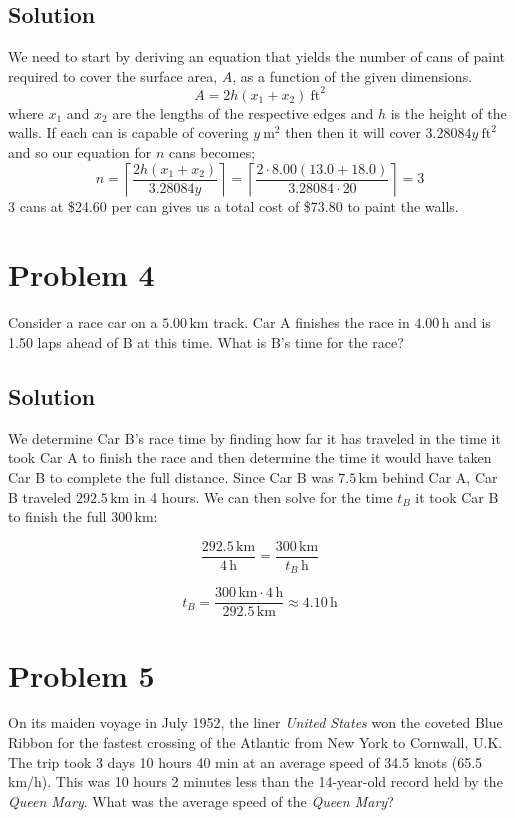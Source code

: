 \documentclass{article}
\newcommand{\kilo}{\text{k}}
\newcommand{\meter}{\text{m}}
\newcommand{\foot}{\text{ft}}
\begin{document}
\subsection*{Solution}
We need to start by deriving an equation that yields the number of cans of paint required to cover the surface area, $A$, as a function of the given dimensions.
\[
	A = 2h(x_1 + x_2)\ \foot^2
\]
where $x_1$ and $x_2$ are the lengths of the respective edges and $h$ is the height of the walls. If each can is capable of covering $y\ \meter^2$ then then it will cover $3.28084y\ \foot^2$ and so our equation for $n$ cans becomes;
\[
	n = \left\lceil\frac{2h(x_1 + x_2)}{3.28084y}\right\rceil = \left\lceil\frac{2\cdot8.00(13.0 + 18.0)}{3.28084\cdot20}\right\rceil = 3
\]
3 cans at \$24.60 per can gives us a total cost of \$73.80 to paint the walls.

\section*{Problem 4}
Consider a race car on a \(5.00 \, \si{\kilo\meter}\) track. Car A finishes the race in \(4.00 \, \si{\hour}\) and is 1.50 laps ahead of B at this time. What is B's time for the race?

\subsection*{Solution}
We determine Car B's race time by finding how far it has traveled in the time it took Car A to finish the race and then determine the time it would have taken Car B to complete the full distance. Since Car B was \(7.5 \, \si{\kilo\meter}\) behind Car A, Car B traveled \(292.5 \, \si{\kilo\meter}\) in 4 hours. We can then solve for the time \( t_B \) it took Car B to finish the full \(300 \, \si{\kilo\meter}\):

\[
\frac{292.5 \, \si{\kilo\meter}}{4 \, \si{\hour}} = \frac{300 \, \si{\kilo\meter}}{t_B \, \si{\hour}}
\]

\[
t_B = \frac{300 \, \si{\kilo\meter} \cdot 4 \, \si{\hour}}{292.5 \, \si{\kilo\meter}} \approx 4.10 \, \si{\hour}
\]

\section*{Problem 5}
On its maiden voyage in July 1952, the liner \textit{United States} won the coveted Blue Ribbon for
the fastest crossing of the Atlantic from New York to Cornwall, U.K. The trip took 3 days 10
hours 40 min at an average speed of 34.5 knots (65.5 km/h). This was 10 hours 2 minutes less than the
14-year-old record held by the \textit{Queen Mary}. What was the average speed of the \textit{Queen Mary}?
\end{document}
